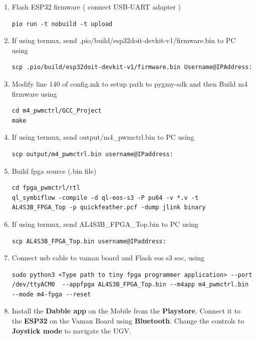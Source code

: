 \begin{enumerate}[label=\thesection.\arabic*.,ref=\thesection.\theenumi]
\item Flash ESP32 firmware ( connect USB-UART adapter )
\begin{lstlisting}
pio run -t nobuild -t upload
\end{lstlisting} 

\item If using termux, send .pio/build/esp32doit-devkit-v1/firmware.bin to PC using
\begin{lstlisting}
scp .pio/build/esp32doit-devkit-v1/firmware.bin Username@IPAddress:
\end{lstlisting} 

\item  Modify line 140 of config.mk to setup path to pygmy-sdk and then Build m4 firmware using
\begin{lstlisting}
cd m4_pwmctrl/GCC_Project
make
\end{lstlisting}

\item If using termux, send output/m4{\_}pwmctrl.bin to PC using
\begin{lstlisting}
scp output/m4_pwmctrl.bin username@IPaddress:
\end{lstlisting} 

\item Build fpga source (.bin file)
\begin{lstlisting}
cd fpga_pwmctrl/rtl
ql_symbiflow -compile -d ql-eos-s3 -P pu64 -v *.v -t AL4S3B_FPGA_Top -p quickfeather.pcf -dump jlink binary 
\end{lstlisting} 

\item If using termux, send AL4S3B{\_}FPGA{\_}Top.bin to PC using
\begin{lstlisting}
scp AL4S3B_FPGA_Top.bin username@IPaddress:
\end{lstlisting} 

\item Connect usb cable to vaman board and Flash eos s3 soc, using
\begin{lstlisting}
sudo python3 <Type path to tiny fpga programmer application> --port /dev/ttyACM0  --appfpga AL4S3B_FPGA_Top.bin --m4app m4_pwmctrl.bin --mode m4-fpga --reset

\end{lstlisting} 

\item Install the \textbf{Dabble app} on the Mobile from the \textbf{Playstore}. Connect it to the \textbf{ESP32} on the Vaman Board using \textbf{Bluetooth}. Change the controls to \textbf{Joystick mode} to navigate the UGV.\\


\end{enumerate}
